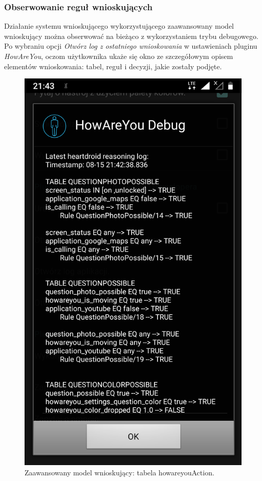 \subsubsection{Obserwowanie reguł wnioskujących}

Działanie systemu wnioskującego wykorzystującego zaawansowany model wnioskujący można obserwować na bieżąco z wykorzystaniem trybu debugowego. Po wybraniu opcji \textit{Otwórz log z ostatniego wnioskowania} w ustawieniach pluginu \textit{HowAreYou}, oczom użytkownika ukaże się okno ze szczegółowym opisem elementów wnioskowania: tabel, reguł i decyzji, jakie zostały podjęte.

\begin{figure}[H]
	\centering
	\includegraphics[scale=0.15]{rozdzial4/HMR_screenshots_A.png}
	\caption{Zaawansowany model wnioskujący: tabela howareyouAction.}
\end{figure}



